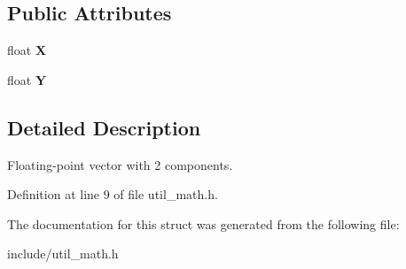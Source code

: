 \subsection*{Public Attributes}
\begin{DoxyCompactItemize}
\item 
\hypertarget{structDOSBox__Vector2_aef551f2de1cde15c12f5a03f0474db43}{float {\bfseries X}}\label{structDOSBox__Vector2_aef551f2de1cde15c12f5a03f0474db43}

\item 
\hypertarget{structDOSBox__Vector2_ab705a2c61d29dbf5c62cee6b83326613}{float {\bfseries Y}}\label{structDOSBox__Vector2_ab705a2c61d29dbf5c62cee6b83326613}

\end{DoxyCompactItemize}


\subsection{Detailed Description}
Floating-\/point vector with 2 components. 

Definition at line 9 of file util\-\_\-math.\-h.



The documentation for this struct was generated from the following file\-:\begin{DoxyCompactItemize}
\item 
include/util\-\_\-math.\-h\end{DoxyCompactItemize}
